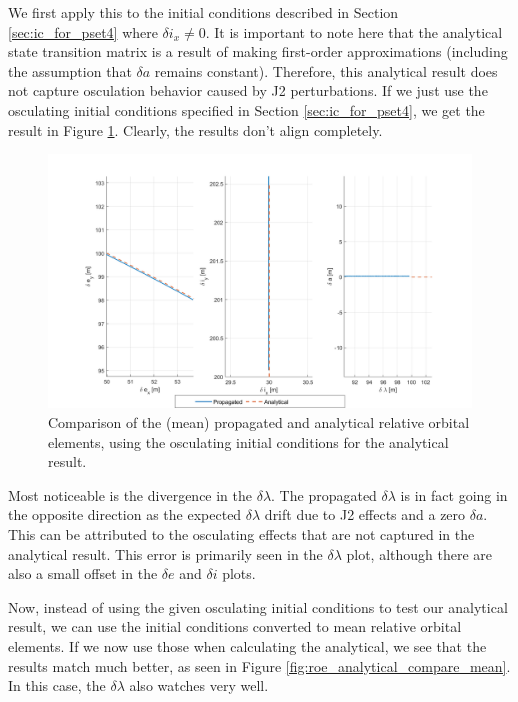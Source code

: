 We first apply this to the initial conditions described in Section \ref{sec:ic_for_pset4} where $\delta i_x \neq 0$.
It is important to note here that the analytical state transition matrix is a result of making first-order approximations (including the assumption that $\delta a$ remains constant). Therefore, this analytical result does not capture osculation behavior caused by J2 perturbations. If we just use the osculating initial conditions specified in Section \ref{sec:ic_for_pset4}, we get the result in Figure \ref{fig:roe_analytical_compare_osc}. Clearly, the results don't align completely.

\begin{figure}[H]
    \centering
    \includegraphics[width=0.8\linewidth]{sim/figures/PS4/ROE_analytical_compare_given_IC2_SV2.png}
    \caption{Comparison of the (mean) propagated and analytical relative orbital elements, using the osculating initial conditions for the analytical result.}
\label{fig:roe_analytical_compare_osc}
\end{figure}

Most noticeable is the divergence in the $\delta \lambda$. The propagated $\delta \lambda$ is in fact going in the opposite direction as the expected $\delta \lambda$ drift due to J2 effects and a zero $\delta a$. This can be attributed to the osculating effects that are not captured in the analytical result. This error is primarily seen in the $\delta \lambda$ plot, although there are also a small offset in the $\delta e$ and $\delta i$ plots.

Now, instead of using the given osculating initial conditions to test our analytical result, we can use the initial conditions converted to mean relative orbital elements. If we now use those when calculating the analytical, we see that the results match much better, as seen in Figure \ref{fig:roe_analytical_compare_mean}. In this case, the $\delta \lambda$ also watches very well.

